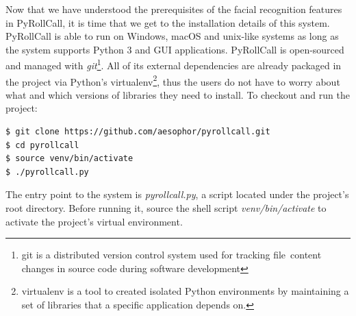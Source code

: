 \vspace{0.5cm}
Now that we have understood the prerequisites of the facial recognition features in PyRollCall,
it is time that we get to the installation details of this system. PyRollCall is able to run on Windows,
macOS and unix-like systems as long as the system supports Python 3 and GUI applications.
PyRollCall is open-sourced and managed with \emph{git}\footnote{git is a distributed version control system used for tracking file\
  content changes in source code during software development}. All of its external dependencies are already packaged
in the project via Python's {virtualenv}\footnote{virtualenv is a tool to created isolated Python environments by maintaining a set of libraries that a specific application depends on.},
thus the users do not have to worry about what and which versions of libraries they need to install. To checkout and run the project:



\begin{lstlisting}[numbers=none,xleftmargin=0em,caption={Shell commands to checkout and run PyRollCall}]
$ git clone https://github.com/aesophor/pyrollcall.git
$ cd pyrollcall
$ source venv/bin/activate
$ ./pyrollcall.py 
\end{lstlisting}

The entry point to the system is \emph{pyrollcall.py}, a script located under the project's root directory.
Before running it, source the shell script \emph{venv/bin/activate} to activate the project's virtual environment.
